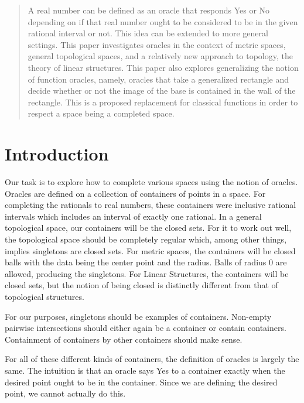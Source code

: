 \maketitle
\begin{abstract}
A real number can be defined as an oracle that responds Yes or No depending on if that real number ought to be considered to be in the given rational interval or not. This idea can be extended to more general settings. This paper investigates oracles in the context of metric spaces, general topological spaces, and a relatively new approach to topology, the theory of linear structures. This paper also explores generalizing the notion of function oracles, namely, oracles that take a generalized rectangle and decide whether or not the image of the base is contained in the wall of the rectangle. This is a proposed replacement for classical functions in order to respect a space being a completed space. 
\end{abstract}

\section{Introduction}

Our task is to explore how to complete various spaces using the notion of oracles. Oracles are defined on a collection of containers of points in a space. For completing the rationals to real numbers, these containers were inclusive rational intervals which includes an interval of exactly one rational. In a general topological space, our containers will be the closed sets. For it to work out well, the topological space should be completely regular which, among other things, implies singletons are closed sets. For metric spaces, the containers will be closed balls with the data being the center point and the radius. Balls of radius 0 are allowed, producing the singletons. For Linear Structures, the containers will be closed sets, but the notion of being closed is distinctly different from that of topological structures. 

For our purposes, singletons should be examples of containers. Non-empty pairwise intersections should either again be a container or contain containers. Containment of containers by other containers should make sense. 

For all of these different kinds of containers, the definition of oracles is largely the same. The intuition is that an oracle says Yes to a container exactly when the desired point ought to be in the container. Since we are defining the desired point, we cannot actually do this. 

